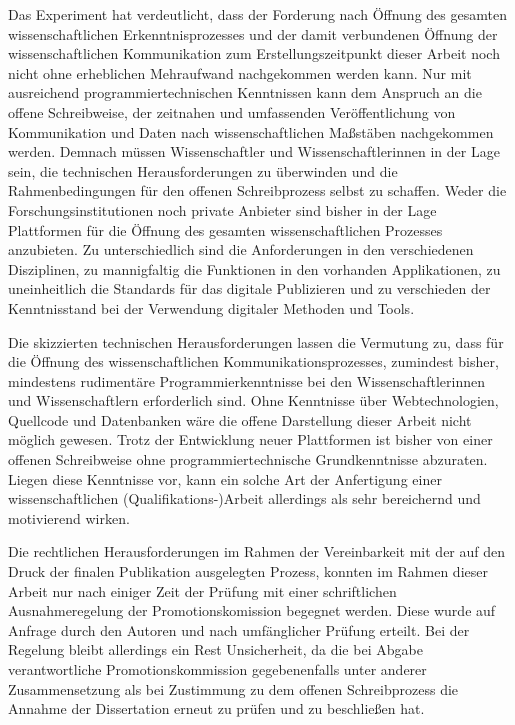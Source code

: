Das Experiment hat verdeutlicht, dass der Forderung nach Öffnung des gesamten wissenschaftlichen Erkenntnisprozesses und der damit verbundenen Öffnung der wissenschaftlichen Kommunikation zum Erstellungszeitpunkt dieser Arbeit noch nicht ohne erheblichen Mehraufwand nachgekommen werden kann. Nur mit ausreichend programmiertechnischen Kenntnissen kann dem Anspruch an die offene Schreibweise, der zeitnahen und umfassenden Veröffentlichung von Kommunikation und Daten nach wissenschaftlichen Maßstäben nachgekommen werden. Demnach müssen Wissenschaftler und Wissenschaftlerinnen in der Lage sein, die technischen Herausforderungen zu überwinden und die Rahmenbedingungen für den offenen Schreibprozess selbst zu schaffen. Weder die Forschungsinstitutionen noch private Anbieter sind bisher in der Lage Plattformen für die Öffnung des gesamten wissenschaftlichen Prozesses anzubieten. Zu unterschiedlich sind die Anforderungen in den verschiedenen Disziplinen, zu mannigfaltig die Funktionen in den vorhanden Applikationen, zu uneinheitlich die Standards für das digitale Publizieren und zu verschieden der Kenntnisstand bei der Verwendung digitaler Methoden und Tools.

Die skizzierten technischen Herausforderungen lassen die Vermutung zu, dass für die Öffnung des wissenschaftlichen Kommunikationsprozesses, zumindest bisher, mindestens rudimentäre Programmierkenntnisse bei den Wissenschaftlerinnen und Wissenschaftlern erforderlich sind. Ohne Kenntnisse über Webtechnologien, Quellcode und Datenbanken wäre die offene Darstellung dieser Arbeit nicht möglich gewesen. Trotz der Entwicklung neuer Plattformen ist bisher von einer offenen Schreibweise ohne programmiertechnische Grundkenntnisse abzuraten. Liegen diese Kenntnisse vor, kann ein solche Art der Anfertigung einer wissenschaftlichen (Qualifikations-)Arbeit allerdings als sehr bereichernd und motivierend wirken.

Die rechtlichen Herausforderungen im Rahmen der Vereinbarkeit mit der auf den Druck der finalen Publikation ausgelegten Prozess, konnten im Rahmen dieser Arbeit nur nach einiger Zeit der Prüfung mit einer schriftlichen Ausnahmeregelung der Promotionskomission begegnet werden. Diese wurde auf Anfrage durch den Autoren und nach umfänglicher Prüfung erteilt. Bei der Regelung bleibt allerdings ein Rest Unsicherheit, da die bei Abgabe verantwortliche Promotionskommission gegebenenfalls unter anderer Zusammensetzung als bei Zustimmung zu dem offenen Schreibprozess die Annahme der Dissertation erneut zu prüfen und zu beschließen hat.

